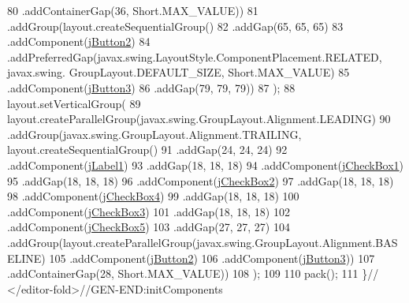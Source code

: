 \begin{DoxyCode}
80                 .addContainerGap(36, Short.MAX\_VALUE))
81             .addGroup(layout.createSequentialGroup()
82                 .addGap(65, 65, 65)
83                 .addComponent(\mbox{\hyperlink{classinterfacessoguar_1_1cu14_aac32954c8931314e7a2554cb59e49c14}{jButton2}})
84                 .addPreferredGap(javax.swing.LayoutStyle.ComponentPlacement.RELATED, javax.swing.
      GroupLayout.DEFAULT\_SIZE, Short.MAX\_VALUE)
85                 .addComponent(\mbox{\hyperlink{classinterfacessoguar_1_1cu14_a11bd8f94543f8cf53621a6e49d32df73}{jButton3}})
86                 .addGap(79, 79, 79))
87         );
88         layout.setVerticalGroup(
89             layout.createParallelGroup(javax.swing.GroupLayout.Alignment.LEADING)
90             .addGroup(javax.swing.GroupLayout.Alignment.TRAILING, layout.createSequentialGroup()
91                 .addGap(24, 24, 24)
92                 .addComponent(\mbox{\hyperlink{classinterfacessoguar_1_1cu14_ae89f56f50be4fe2708a41087efcd4f01}{jLabel1}})
93                 .addGap(18, 18, 18)
94                 .addComponent(\mbox{\hyperlink{classinterfacessoguar_1_1cu14_a2719e7cf9ebc34ab6a28e47fe931c20c}{jCheckBox1}})
95                 .addGap(18, 18, 18)
96                 .addComponent(\mbox{\hyperlink{classinterfacessoguar_1_1cu14_a208f32a207595bd065c51596f0071a50}{jCheckBox2}})
97                 .addGap(18, 18, 18)
98                 .addComponent(\mbox{\hyperlink{classinterfacessoguar_1_1cu14_ae6475562256fe6faa9f5f9cd776c64ab}{jCheckBox4}})
99                 .addGap(18, 18, 18)
100                 .addComponent(\mbox{\hyperlink{classinterfacessoguar_1_1cu14_a4c2786ad18eecca82117bb2332a5cd4e}{jCheckBox3}})
101                 .addGap(18, 18, 18)
102                 .addComponent(\mbox{\hyperlink{classinterfacessoguar_1_1cu14_a76e9292b610a4832a729e128895d01cf}{jCheckBox5}})
103                 .addGap(27, 27, 27)
104                 .addGroup(layout.createParallelGroup(javax.swing.GroupLayout.Alignment.BASELINE)
105                     .addComponent(\mbox{\hyperlink{classinterfacessoguar_1_1cu14_aac32954c8931314e7a2554cb59e49c14}{jButton2}})
106                     .addComponent(\mbox{\hyperlink{classinterfacessoguar_1_1cu14_a11bd8f94543f8cf53621a6e49d32df73}{jButton3}}))
107                 .addContainerGap(28, Short.MAX\_VALUE))
108         );
109 
110         pack();
111     \}\textcolor{comment}{// </editor-fold>//GEN-END:initComponents}
\end{DoxyCode}
\mbox{\label{classinterfacessoguar_1_1cu14_ab06e0dd8b0c928c7b075a14a321a95d3}} 
